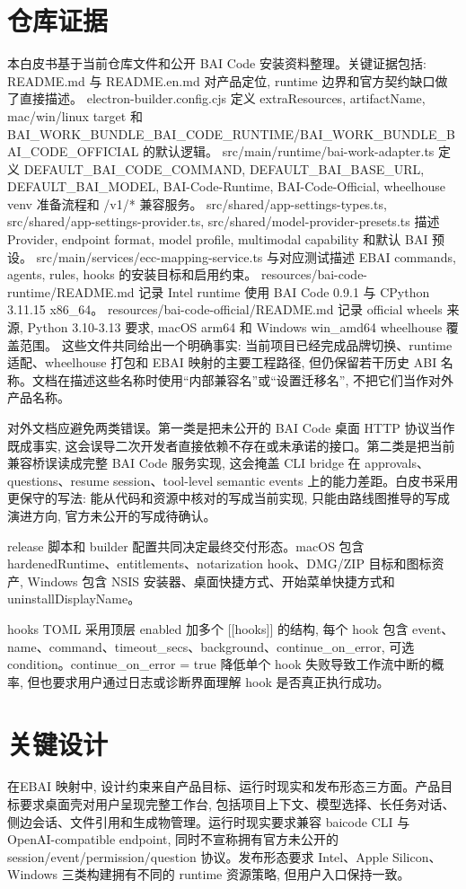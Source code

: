 \section{仓库证据}
本白皮书基于当前仓库文件和公开 BAI Code 安装资料整理。关键证据包括: README.md 与 README.en.md 对产品定位, runtime 边界和官方契约缺口做了直接描述。 electron-builder.config.cjs 定义 extraResources, artifactName, mac/win/linux target 和 BAI\_WORK\_BUNDLE\_BAI\_CODE\_RUNTIME/BAI\_WORK\_BUNDLE\_BAI\_CODE\_OFFICIAL 的默认逻辑。 src/main/runtime/bai-work-adapter.ts 定义 DEFAULT\_BAI\_CODE\_COMMAND, DEFAULT\_BAI\_BASE\_URL, DEFAULT\_BAI\_MODEL, BAI-Code-Runtime, BAI-Code-Official, wheelhouse venv 准备流程和 /v1/* 兼容服务。 src/shared/app-settings-types.ts, src/shared/app-settings-provider.ts, src/shared/model-provider-presets.ts 描述 Provider, endpoint format, model profile, multimodal capability 和默认 BAI 预设。 src/main/services/ecc-mapping-service.ts 与对应测试描述 EBAI commands, agents, rules, hooks 的安装目标和启用约束。 resources/bai-code-runtime/README.md 记录 Intel runtime 使用 BAI Code 0.9.1 与 CPython 3.11.15 x86\_64。 resources/bai-code-official/README.md 记录 official wheels 来源, Python 3.10-3.13 要求, macOS arm64 和 Windows win\_amd64 wheelhouse 覆盖范围。 这些文件共同给出一个明确事实: 当前项目已经完成品牌切换、runtime 适配、wheelhouse 打包和 EBAI 映射的主要工程路径, 但仍保留若干历史 ABI 名称。文档在描述这些名称时使用“内部兼容名”或“设置迁移名”, 不把它们当作对外产品名称。

对外文档应避免两类错误。第一类是把未公开的 BAI Code 桌面 HTTP 协议当作既成事实, 这会误导二次开发者直接依赖不存在或未承诺的接口。第二类是把当前兼容桥误读成完整 BAI Code 服务实现, 这会掩盖 CLI bridge 在 approvals、questions、resume session、tool-level semantic events 上的能力差距。白皮书采用更保守的写法: 能从代码和资源中核对的写成当前实现, 只能由路线图推导的写成演进方向, 官方未公开的写成待确认。

release 脚本和 builder 配置共同决定最终交付形态。macOS 包含 hardenedRuntime、entitlements、notarization hook、DMG/ZIP 目标和图标资产, Windows 包含 NSIS 安装器、桌面快捷方式、开始菜单快捷方式和 uninstallDisplayName。

hooks TOML 采用顶层 enabled 加多个 [[hooks]] 的结构, 每个 hook 包含 event、name、command、timeout\_secs、background、continue\_on\_error, 可选 condition。continue\_on\_error = true 降低单个 hook 失败导致工作流中断的概率, 但也要求用户通过日志或诊断界面理解 hook 是否真正执行成功。

\section{关键设计}
在EBAI 映射中, 设计约束来自产品目标、运行时现实和发布形态三方面。产品目标要求桌面壳对用户呈现完整工作台, 包括项目上下文、模型选择、长任务对话、侧边会话、文件引用和生成物管理。运行时现实要求兼容 baicode CLI 与 OpenAI-compatible endpoint, 同时不宣称拥有官方未公开的 session/event/permission/question 协议。发布形态要求 Intel、Apple Silicon、Windows 三类构建拥有不同的 runtime 资源策略, 但用户入口保持一致。

